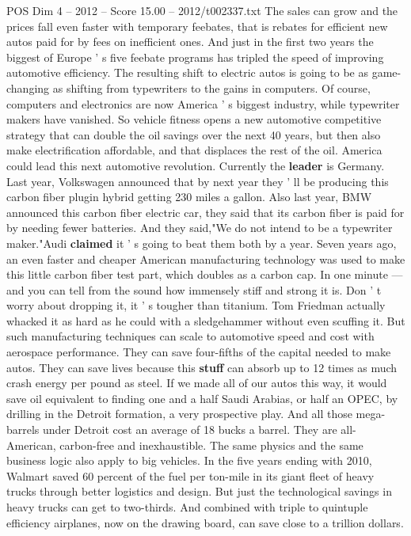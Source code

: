 \begin{textsample}{POS Dim 4 – 2012 – Score 15.00 – 2012/t002337.txt}
The sales can grow and the prices fall even faster with temporary feebates, that is rebates for efficient new autos paid for by fees on inefficient ones.
And just in the first two years the biggest of Europe ' s five feebate programs has tripled the speed of improving automotive efficiency.
The resulting shift to electric autos is going to be as game-changing as shifting from typewriters to the gains in computers.
Of course, computers and electronics are now America ' s biggest industry, while typewriter makers have vanished.
So vehicle fitness opens a new automotive competitive strategy that can double the oil savings over the next 40 years, but then also make electrification affordable, and that displaces the rest of the oil.
America could lead this next automotive revolution.
Currently the \textbf{leader} is Germany.
Last year, Volkswagen announced that by next year they ' ll be producing this carbon fiber plugin hybrid getting 230 miles a gallon.
Also last year, BMW announced this carbon fiber electric car, they said that its carbon fiber is paid for by needing fewer batteries.
And they said,"We do not intend to be a typewriter maker."Audi \textbf{claimed} it ' s going to beat them both by a year.
Seven years ago, an even faster and cheaper American manufacturing technology was used to make this little carbon fiber test part, which doubles as a carbon cap.
In one minute — and you can tell from the sound how immensely stiff and strong it is.
Don ' t worry about dropping it, it ' s tougher than titanium.
Tom Friedman actually whacked it as hard as he could with a sledgehammer without even scuffing it.
But such manufacturing techniques can scale to automotive speed and cost with aerospace performance.
They can save four-fifths of the capital needed to make autos.
They can save lives because this \textbf{stuff} can absorb up to 12 times as much crash energy per pound as steel.
If we made all of our autos this way, it would save oil equivalent to finding one and a half Saudi Arabias, or half an OPEC, by drilling in the Detroit formation, a very prospective play.
And all those mega-barrels under Detroit cost an average of 18 bucks a barrel.
They are all- American, carbon-free and inexhaustible.
The same physics and the same business logic also apply to big vehicles.
In the five years ending with 2010, Walmart saved 60 percent of the fuel per ton-mile in its giant fleet of heavy trucks through better logistics and design.
But just the technological savings in heavy trucks can get to two-thirds.
And combined with triple to quintuple efficiency airplanes, now on the drawing board, can save close to a trillion dollars.

\end{textsample}
